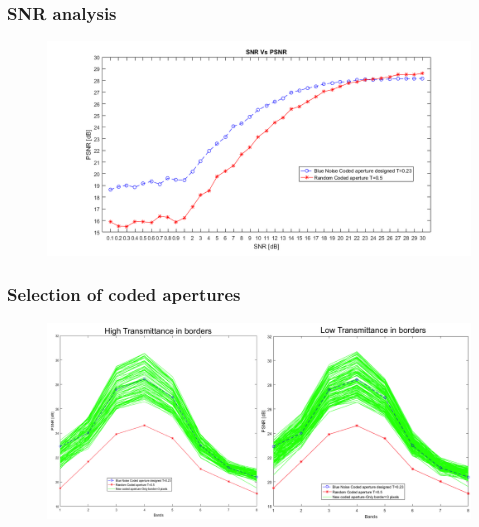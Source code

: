 \documentclass{beamer}
\begin{document}

\begin{frame}
\frametitle{SNR analysis}

\begin{figure}
\centering
\includegraphics[scale=0.45]{FiguresUpd/SNRvsPSNR.png}
\end{figure}
\end{frame}



\begin{frame}
\frametitle{Selection of coded apertures}

\begin{figure}
\centering
\includegraphics[scale=0.35]{FiguresUpd/simulations.png}
\end{figure}
\end{frame}

\end{document}
